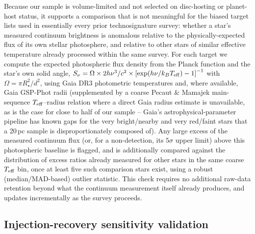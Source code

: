 \documentclass{openjournal}
\begin{document}
Because our sample is volume-limited and not selected on disc-hosting or
planet-host status, it supports a comparison that is not meaningful for
the biased target lists used in essentially every prior technosignature
survey: whether a star's measured continuum brightness is anomalous
relative to the physically-expected flux of its own stellar photosphere,
and relative to other stars of similar effective temperature already
processed within the same survey. For each target we compute the
expected photospheric flux density from the Planck function and the
star's own solid angle,
$S_\nu = \Omega \times 2h\nu^3/c^2 \times \left[\exp(h\nu/k_BT_{\rm eff}) - 1\right]^{-1}$
with $\Omega = \pi R_\star^2/d^2$, using Gaia DR3 photometric
temperatures and, where available, Gaia GSP-Phot radii (supplemented by a
coarse Pecaut \& Mamajek main-sequence $T_{\rm eff}$--radius relation
where a direct Gaia radius estimate is unavailable, as is the case for
close to half of our sample -- Gaia's astrophysical-parameter pipeline
has known gaps for the very bright/nearby and very red/faint stars that
a 20\,pc sample is disproportionately composed of). Any large excess of
the measured continuum flux (or, for a non-detection, its $5\sigma$ upper
limit) above this photospheric baseline is flagged, and is additionally
compared against the distribution of excess ratios already measured for
other stars in the same coarse $T_{\rm eff}$ bin, once at least five such
comparison stars exist, using a robust (median/MAD-based) outlier
statistic. This check requires no additional raw-data retention beyond
what the continuum measurement itself already produces, and updates
incrementally as the survey proceeds.

\subsection{Injection-recovery sensitivity validation}
\label{sec:injectrecovery}
\end{document}
